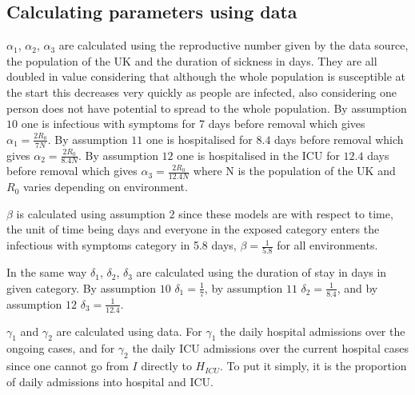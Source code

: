 \documentclass[11pt]{article}
\begin{document}
\subsection{Calculating parameters using data}
$\alpha_1$, $\alpha_2$, $\alpha_3$ are calculated using the reproductive number given by the data source, the population of the UK and the duration of sickness in days. They are all doubled in value considering that although the whole population is susceptible at the start this decreases very quickly as people are infected, also considering one person does not have potential to spread to the whole population. By assumption $10$ one is infectious with symptoms for 7 days before removal which gives $\alpha_1=\frac{2R_0}{7N}$. By assumption $11$ one is hospitalised for $8.4$ days before removal which gives $\alpha_2=\frac{2R_0}{8.4N}$. By assumption $12$ one is hospitalised in the ICU for $12.4$ days before removal which gives $\alpha_3=\frac{2R_0}{12.4N}$ where N is the population of the UK and $R_0$ varies depending on environment. \par
$\beta$ is calculated using assumption $2$ since these models are with respect to time, the unit of time being days and everyone in the exposed category enters the infectious with symptoms category in 5.8 days, $\beta=\frac{1}{5.8}$ for all environments. \par
In the same way $\delta_1$, $\delta_2$, $\delta_3$ are calculated using the duration of stay in days in given category. By assumption $10$ $\delta_1=\frac{1}{7}$, by assumption $11$ $\delta_2=\frac{1}{8.4}$, and by assumption $12$ $\delta_3=\frac{1}{12.4}$. \par
$\gamma_1$ and $\gamma_2$ are calculated using data. For $\gamma_1$ the daily hospital admissions over the ongoing cases, and for $\gamma_2$ the daily ICU admissions over the current hospital cases since one cannot go from $I$ directly to $H_{ICU}$. To put it simply, it is the proportion of daily admissions into hospital and ICU.
\end{document}
